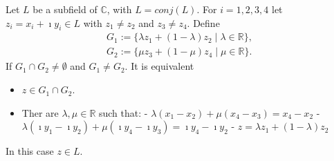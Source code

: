 \begin{lemma}
    \label{Intersection_line_line}
    Let $L$ be a subfield of $\mathbb{C}$, with $L = conj(L)$. For $i = 1,2,3,4$ let $z_i = x_i + \imath y_i \in L$ with $z_1 \ne z_2$ and $z_3 \ne z_4$. Define
    \begin{equation*}\begin{aligned}
        G_1 := \{\lambda z_1 + (1-\lambda)z_2 \mid \lambda \in \mathbb{R}\},\\
        G_2 := \{\mu z_3 + (1-\mu)z_4 \mid \mu \in \mathbb{R}\}.
    \end{aligned} \end{equation*}
    If $G_1 \cap G_2 \ne \emptyset$ and $G_1 \ne G_2$. It is equivalent 
    \begin{itemize}
        \item $z\in G_1 \cap G_2$.
        \item Ther are $\lambda, \mu \in \mathbb{R}$ such that:
        \subitem - $\lambda(x_1 - x_2)+\mu(x_4-x_3) = x_4-x_2$
        \subitem - $\lambda(\imath y_1 - \imath y_2)+\mu(\imath y_4-\imath y_3) = \imath y_4-\imath y_2$
        \subitem - $z = \lambda z_1 + (1-\lambda)z_2$
    \end{itemize}
    In this case $z \in L$.
\end{lemma}

